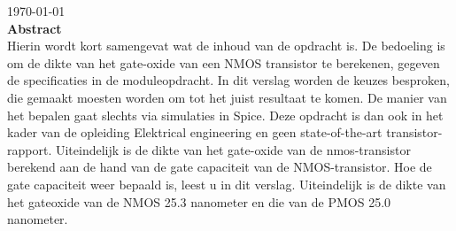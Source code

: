 \begin{titlepage}

{\large \today}\\[3cm] %


 
% 

\textbf{Abstract} \\
Hierin wordt kort samengevat wat de inhoud van de opdracht is. De bedoeling is om de dikte van het gate-oxide van een NMOS transistor te berekenen, gegeven de specificaties 
in de moduleopdracht. In dit verslag worden de keuzes besproken, die gemaakt moesten worden om tot het juist resultaat te komen. De manier van het 
bepalen gaat slechts via simulaties in Spice. Deze opdracht is dan ook in het kader van de opleiding Elektrical engineering en geen state-of-the-art transistor-rapport.  Uiteindelijk is de dikte van het gate-oxide van de nmos-transistor berekend aan de hand van de gate capaciteit van de NMOS-transistor. Hoe de gate capaciteit weer bepaald is, leest u in dit verslag.
Uiteindelijk is de dikte van het gateoxide van de NMOS 25.3 nanometer en die van de PMOS 25.0 nanometer.  

\vfill %

\end{titlepage}
